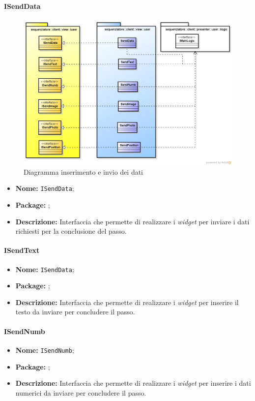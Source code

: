 \paragraph{ISendData}
\begin{figure}[H] \centering \includegraphics[width=%
\textwidth]
{./pack/SendData.png} \caption{Diagramma inserimento e invio dei dati}
\end{figure}
\begin{itemize}
\item \textbf{Nome:} \texttt{ISendData};
\item \textbf{Package:} \texttt{\iViewUser{}};
\item \textbf{Descrizione:} Interfaccia che permette di realizzare i \textit{widget} per inviare i dati richiesti per la conclusione del passo.
\end{itemize}

\paragraph{ISendText}
\begin{itemize}
\item \textbf{Nome:} \texttt{ISendData};
\item \textbf{Package:} \texttt{\iViewUser{}};
\item \textbf{Descrizione:} Interfaccia che permette di realizzare i \textit{widget} per inserire il testo da inviare per concludere il passo.
\end{itemize}

\paragraph{ISendNumb}
\begin{itemize}
\item \textbf{Nome:} \texttt{ISendNumb};
\item \textbf{Package:} \texttt{\iViewUser{}};
\item \textbf{Descrizione:} Interfaccia che permette di realizzare i \textit{widget} per inserire i dati numerici da inviare per concludere il passo.
\end{itemize}

